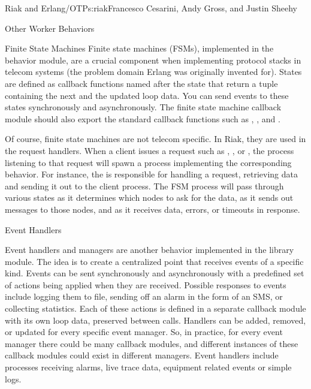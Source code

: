 \begin{aosachapter}{Riak and Erlang/OTP}{s:riak}{Francesco Cesarini, Andy Gross, and Justin Sheehy}
\begin{aosasect1}{Other Worker Behaviors}
\begin{aosasect2}{Finite State Machines}
Finite state machines (FSMs), implemented in the  behavior
module, are a crucial component when implementing protocol stacks in
telecom systems (the problem domain Erlang was originally invented
for). States are defined as callback functions named after the state
that return a tuple containing the next  and the updated
loop data. You can send events to these states synchronously and
asynchronously. The finite state machine callback module should also
export the standard callback functions such as ,
, and .

Of course, finite state machines are not telecom specific. In Riak,
they are used in the request handlers. When a client issues a request
such as , , or , the process
listening to that request will spawn a process implementing the
corresponding  behavior. For instance, the
 is responsible for handling a 
request, retrieving data and sending it out to the client process. The
FSM process will pass through various states as it determines which
nodes to ask for the data, as it sends out messages to those nodes, and as
it receives data, errors, or timeouts in response.

\end{aosasect2}

\begin{aosasect2}{Event Handlers}

Event handlers and managers are another behavior implemented in the
 library module. The idea is to create a centralized
point that receives events of a specific kind. Events can be sent
synchronously and asynchronously with a predefined set of actions
being applied when they are received. Possible responses to events
include logging them to file, sending off an alarm in the form of an
SMS, or collecting statistics. Each of these actions is defined in a
separate callback module with its own loop data, preserved between
calls. Handlers can be added, removed, or updated for every specific
event manager. So, in practice, for every event manager there could
be many callback modules, and different instances of these callback
modules could exist in different managers. Event handlers include
processes receiving alarms, live trace data, equipment related events
or simple logs.


\end{aosasect2}
\end{aosasect1}
\end{aosachapter}
